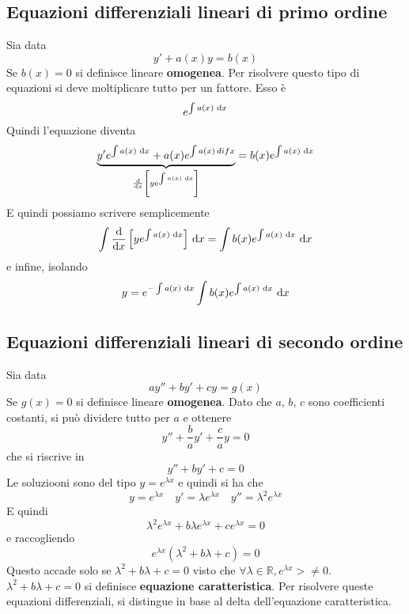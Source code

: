 \subsection{Equazioni differenziali lineari di primo ordine}
Sia data
\begin{equation*}
  y'+a(x)y=b(x)
\end{equation*}
Se $b(x)=0$ si definisce lineare \textbf{omogenea}. Per risolvere questo tipo di equazioni si deve
moltiplicare tutto per un fattore. Esso è
\begin{equation*}
  e^{\int a(x)\,\mathop{}\!\mathrm{d} x}
\end{equation*}
Quindi l'equazione diventa
\begin{equation*}
  \underbrace{y'e^{\int a(x)\,\mathop{}\!\mathrm{d} x}+a(x)e^{\int a(x)\,dif x}}_
  {\frac{\mathop{}\!\mathrm{d}}{\mathop{}\!\mathrm{d} x}\left[ ye^{\int a(x)\,\mathop{}\!\mathrm{d} x} \right]}=b(x)e^{\int a(x)\,\mathop{}\!\mathrm{d} x}
\end{equation*}
E quindi possiamo scrivere semplicemente
\begin{equation*}
  \int \frac{\mathop{}\!\mathrm{d}}{\mathop{}\!\mathrm{d} x}\left[ ye^{\int a(x)\,\mathop{}\!\mathrm{d} x} \right]\,\mathop{}\!\mathrm{d} x = 
  \int b(x)e^{\int a(x)\,\mathop{}\!\mathrm{d} x}\,\mathop{}\!\mathrm{d} x
\end{equation*}
e infine, isolando
\begin{equation*}
  y = e^{-\int a(x)\,\mathop{}\!\mathrm{d} x}\int b(x)e^{\int a(x)\,\mathop{}\!\mathrm{d} x}\,\mathop{}\!\mathrm{d} x
\end{equation*}

\subsection{Equazioni differenziali lineari di secondo ordine}
Sia data
\begin{equation*}
  ay''+by'+cy=g(x) 
\end{equation*}
Se $g(x)=0$ si definisce lineare \textbf{omogenea}. Dato che $a$, $b$, $c$ sono coefficienti 
costanti, si può dividere tutto per $a$ e ottenere
\begin{equation*}
  y''+\frac{b}{a}y'+\frac{c}{a}y=0
\end{equation*}
che si riscrive in
\begin{equation*}
  y''+by'+c=0
\end{equation*}
Le soluziooni sono del tipo $y=e^{\lambda x}$ e quindi si ha che
\begin{equation*}
  y = e^{\lambda x}\quad y'=\lambda e^{\lambda x}\quad y''=\lambda^2 e^{\lambda x}
\end{equation*}
E quindi
\begin{equation*}
  \lambda^2 e^{\lambda x}+b\lambda e^{\lambda x}+ce^{\lambda x}=0
\end{equation*}
e raccogliendo
\begin{equation*}
  e^{\lambda x}(\lambda^2+b\lambda+c)=0
\end{equation*}
Questo accade solo se $\lambda^2+b\lambda+c=0$ visto che 
$\forall \lambda\in\mathbb{R}, e^{\lambda x}>\neq 0$. $\lambda^2+b\lambda+c=0$ si definisce
\textbf{equazione caratteristica}. Per risolvere queste equazioni differenziali, si distingue in base
al delta dell'equazione caratteristica.
